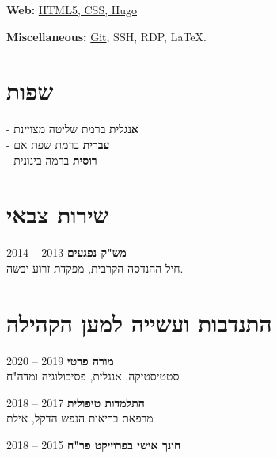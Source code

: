\documentclass[
	12pt,a4paper %
]{article}
\begin{document}
\begin{hebrew}
\begin{paracol}{2}
\textbf{Web:} \href{https://kirilu.netlify.app/resume/}{HTML5, CSS, Hugo}


\textbf{Miscellaneous:} \href{https://github.com/kiril-u}{Git}, SSH, RDP, \LaTeX.

		\unsetLTR
		\setRTL
		\switchcolumn

		\section{שפות}
		- \textbf{אנגלית} ברמת שליטה מצויינת \\
		- \textbf{עברית} ברמת שפת אם \\
		- \textbf{רוסית} ברמה בינונית

		\section{שירות צבאי}
		\textbf{מש"ק נפגעים} \hfill 2013 -- 2014 \\
		חיל ההנדסה הקרבית, מפקדת זרוע יבשה.

		\section{התנדבות ועשייה למען הקהילה}
		
		\textbf{מורה פרטי} \hfill 2019 -- 2020 \\
		סטטיסטיקה, אנגלית, פסיכולוגיה ומדה"ח

		\textbf{התלמדות טיפולית} \hfill 2017 -- 2018 \\
		מרפאת בריאות הנפש הדקל, אילת

		\textbf{חונך אישי בפרוייקט פר"ח} \hfill 2015 -- 2018
	\end{paracol} %
\end{hebrew}
\unsetRTL
\end{document}
